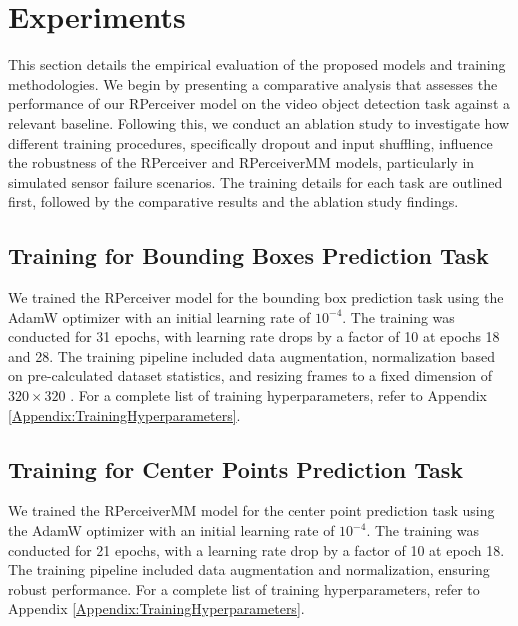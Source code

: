 \section{Experiments}  \label{Experiments}

This section details the empirical evaluation of the proposed models and training methodologies. We begin by presenting a comparative analysis that assesses the performance of our RPerceiver model on the video object detection task against a relevant baseline. Following this, we conduct an ablation study to investigate how different training procedures, specifically dropout and input shuffling, influence the robustness of the RPerceiver and RPerceiverMM models, particularly in simulated sensor failure scenarios. The training details for each task are outlined first, followed by the comparative results and the ablation study findings.

\subsection{Training for Bounding Boxes Prediction Task} \label{Experiments:TrainingBoundingBoxesTask}

We trained the RPerceiver model for the bounding box prediction task using the AdamW optimizer \cite{loshchilovDecoupledWeightDecay2019a} with an initial learning rate of $10^{-4}$. The training was conducted for 31 epochs, with learning rate drops by a factor of 10 at epochs 18 and 28. The training pipeline included data augmentation, normalization based on pre-calculated dataset statistics, and resizing frames to a fixed dimension of $ 320 \times 320 $ \cite{redmonYOLO9000BetterFaster2016}. For a complete list of training hyperparameters, refer to Appendix \ref{Appendix:TrainingHyperparameters}.

\subsection{Training for Center Points Prediction Task} \label{Experiments:TrainingCenterPointsTask}

We trained the RPerceiverMM model for the center point prediction task using the AdamW optimizer \cite{loshchilovDecoupledWeightDecay2019a} with an initial learning rate of $10^{-4}$. The training was conducted for 21 epochs, with a learning rate drop by a factor of 10 at epoch 18. The training pipeline included data augmentation and normalization, ensuring robust performance. For a complete list of training hyperparameters, refer to Appendix \ref{Appendix:TrainingHyperparameters}.

